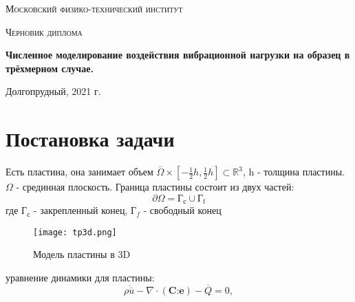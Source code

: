 \documentclass[a4paper,12pt]{article}
\begin{document}
\begin{titlepage}
	\centering
	\vspace{5cm}
	{\scshape\LARGE Московский физико-технический институт \par}
	\vspace{4cm}
	{\scshape\Large Черновик диплома \par}
	\vspace{1cm}
        
           	{\huge\bfseries  Численное моделирование воздействия вибрационной нагрузки на образец в трёхмерном случае. \par} 
        

	\vspace{1cm}
	\vfill
\begin{flushright}
	{\Large }\par
	\vspace{0.3cm}
	{\large  \par
                 
 } \par

\end{flushright}
	

	\vfill

	Долгопрудный, 2021 г.
\end{titlepage}


\section{Постановка задачи}

Есть пластина, она занимает объем $\overline{\Omega} \times [-\frac{1}{2}h, \frac{1}{2}h] \subset \mathbb{R}^3$, h - толщина пластины. $\Omega$ - срединная плоскость. Граница пластины состоит из двух частей:
\begin{equation}
    \partial \Omega = \text{Г}_{\text{с}} \cup \text{Г}_{\text{f}}
\end{equation}
где $\text{Г}_{\text{с}}$ - закрепленный конец, $\text{Г}_f$ - свободный конец
\begin{figure}[H]
	\begin{center}
		\texttt{[image: tp3d.png]}
		\caption{Модель пластины в 3D}
	\end{center}
\end{figure}


уравнение динамики для пластины: 
\begin{equation}
\rho\ddot{\overline{u}} -  \nabla \cdot ( \textbf{C:e}) - \overline{Q} = 0,
\end{equation}
\end{document}
